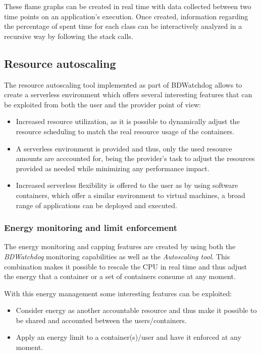 \documentclass[12pt]{article}
\begin{document}
These flame graphs can be created in real time with data collected between two time points on an application's execution. Once created, information regarding the percentage of spent time for each class can be interactively analyzed in a recursive way by following the stack calls.

\subsection{Resource autoscaling}


The resource autoscaling tool implemented as part of BDWatchdog allows to create a serverless environment which offers several interesting features that can be exploited from both the user and the provider point of view:

\begin{itemize}
	\item Increased resource utilization, as it is possible to dynamically adjust the resource scheduling to match the real resource usage of the containers.
	\item A serverless environment is provided and thus, only the used resource amounts are acccounted for, being the provider's task to adjust the resources provided as needed while minimizing any performance impact.
	\item Increased serverless flexibility is offered to the user as by using software containers, which offer a similar environment to virtual machines, a broad range of applications can be deployed and executed.
\end{itemize}


\subsubsection{Energy monitoring and limit enforcement}

The energy monitoring and capping features are created by using both the \textit{BDWatchdog} monitoring capabilities as well as the \textit{Autoscaling tool}. This combination makes it possible to rescale the CPU in real time and thus adjust the energy that a container or a set of containers consume at any moment.

With this energy management some interesting features can be exploited:
\begin{itemize}
	\item Consider energy as another accountable resource and thus make it possible to be shared and accounted between the users/containers.
	\item Apply an energy limit to a container(s)/user and have it enforced at any moment.
\end{itemize}
\end{document}
